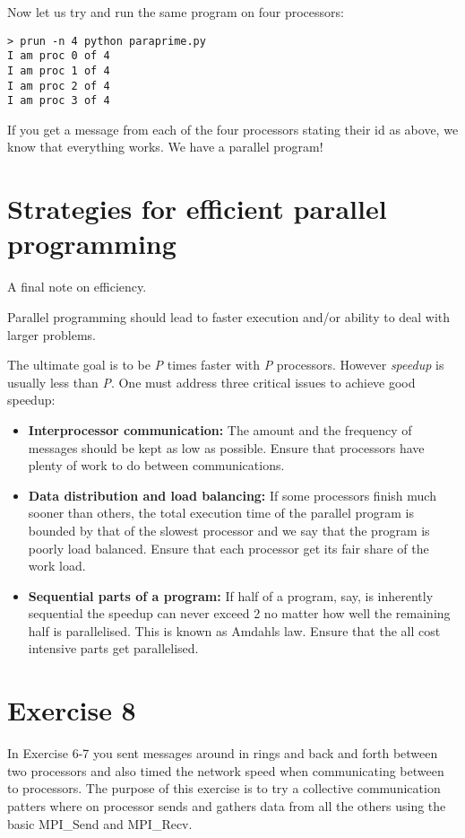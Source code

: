 \documentclass[12pt]{article}
\begin{document}
\noindent Now let us try and run the same program on four processors:
{\small \begin{verbatim}
> prun -n 4 python paraprime.py
I am proc 0 of 4
I am proc 1 of 4
I am proc 2 of 4
I am proc 3 of 4
\end{verbatim}}
If you get a message from each of the four processors stating their
id as above, we know that everything works. We have a parallel program!

\section{Strategies for efficient parallel programming}
A final note on efficiency.

Parallel programming should lead to faster execution and/or
ability to deal with larger problems.

The ultimate goal is to be \emph{P} times faster with \emph{P} processors.
However \emph{speedup} is usually less than \emph{P}. One must address
three critical issues to achieve good speedup:
\begin{itemize}
  \item \textbf{Interprocessor communication:} The amount and the frequency
  of messages should be kept as low as possible. Ensure that processors
  have plenty of work to do between communications.
  \item \textbf{Data distribution and load balancing:} If some processors
  finish much sooner than others, the total execution time of the parallel
  program is bounded by that of the slowest processor and we say that the
  program is poorly load balanced.
  Ensure that each processor get its fair share of the work load.
  \item \textbf{Sequential parts of a program:} If half of a program, say, is
  inherently sequential the speedup can never exceed 2 no matter how well
  the remaining half is parallelised. This is known as Amdahls law.
  Ensure that the all cost intensive parts get parallelised.
\end{itemize}





\section*{Exercise 8}

In Exercise 6-7 you sent messages around in rings and back and forth between
two processors and also timed the network speed when communicating between to
processors.
The purpose of this exercise is to try a collective communication patters
where on processor sends and gathers data from all the others using the
basic MPI\_Send and MPI\_Recv.
\end{document}

